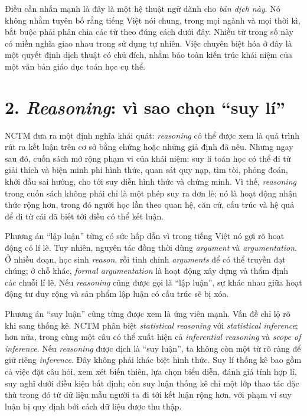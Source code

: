 Điều cần nhấn mạnh là đây là một hệ thuật ngữ dành cho \emph{bản dịch này}. Nó không nhằm tuyên bố rằng tiếng Việt nói chung, trong mọi ngành và mọi thời kì, bắt buộc phải phân chia các từ theo đúng cách dưới đây. Nhiều từ trong số này có miền nghĩa giao nhau trong sử dụng tự nhiên. Việc chuyên biệt hóa ở đây là một quyết định dịch thuật có chủ đích, nhằm bảo toàn kiến trúc khái niệm của một văn bản giáo dục toán học cụ thể.

\section*{2. \emph{Reasoning}: vì sao chọn ``suy lí''}

NCTM đưa ra một định nghĩa khái quát: \emph{reasoning} có thể được xem là quá trình rút ra kết luận trên cơ sở bằng chứng hoặc những giả định đã nêu. Nhưng ngay sau đó, cuốn sách mở rộng phạm vi của khái niệm: suy lí toán học có thể đi từ giải thích và biện minh phi hình thức, quan sát quy nạp, tìm tòi, phỏng đoán, khởi đầu sai hướng, cho tới suy diễn hình thức và chứng minh. Vì thế, \emph{reasoning} trong cuốn sách không phải chỉ là một phép suy ra đơn lẻ; nó là hoạt động nhận thức rộng hơn, trong đó người học lần theo quan hệ, căn cứ, cấu trúc và hệ quả để đi từ cái đã biết tới điều có thể kết luận.

Phương án ``lập luận'' từng có sức hấp dẫn vì trong tiếng Việt nó gợi rõ hoạt động có lí lẽ. Tuy nhiên, nguyên tác đồng thời dùng \emph{argument} và \emph{argumentation}. Ở nhiều đoạn, học sinh \emph{reason}, rồi tinh chỉnh \emph{arguments} để có thể truyền đạt chúng; ở chỗ khác, \emph{formal argumentation} là hoạt động xây dựng và thẩm định các chuỗi lí lẽ. Nếu \emph{reasoning} cũng được gọi là ``lập luận'', sự khác nhau giữa hoạt động tư duy rộng và sản phẩm lập luận có cấu trúc sẽ bị xóa.

Phương án ``suy luận'' cũng từng được xem là ứng viên mạnh. Vấn đề chỉ lộ rõ khi sang thống kê. NCTM phân biệt \emph{statistical reasoning} với \emph{statistical inference}; hơn nữa, trong cùng một câu có thể xuất hiện cả \emph{inferential reasoning} và \emph{scope of inference}. Nếu \emph{reasoning} được dịch là ``suy luận'', ta không còn một từ rõ ràng để giữ riêng \emph{inference}. Đây không phải khác biệt hình thức. Suy lí thống kê bao gồm cả việc đặt câu hỏi, xem xét biến thiên, lựa chọn biểu diễn, đánh giá tính hợp lí, suy nghĩ dưới điều kiện bất định; còn suy luận thống kê chỉ một lớp thao tác đặc thù trong đó từ dữ liệu mẫu người ta đi tới kết luận rộng hơn, với phạm vi suy luận bị quy định bởi cách dữ liệu được thu thập.

